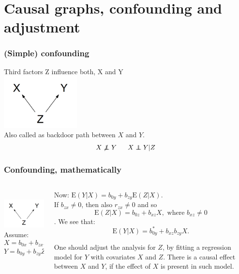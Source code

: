 \documentclass[10pt,dvipsnames,t ,handout%
,aspectratio=169%
]{beamer}%
\newcommand{\E}{\mathrm{E}}
\newcommand{\indep}{\perp\!\!\!\!\perp}
\begin{document}
\section{Causal graphs, confounding and adjustment}


\begin{frame}
	\frametitle{(Simple) confounding}
	Third factors  Z influence both, X and Y \\
	\includegraphics[width=4cm]{conf1}\\
	Also called as \alert{backdoor path} between $X$ and $Y$. \\
	
$$X \not\indep Y \; \hspace{0.5cm}  X \indep Y|Z$$
	
\end{frame}

\begin{frame}
	\frametitle{Confounding, mathematically}
\begin{columns}
\begin{column}{5cm}
\mbox{ } \\
	\includegraphics[width=4cm]{conf1}
	\mbox{}\\[0.5cm]
Assume:
$$X= b_{0x} + b_{zx}Z + \varepsilon_x, \ \E(\varepsilon_x|Z)=0 $$  
$$ Y= b_{0y} + b_{zy}Z + \varepsilon_y, \ \E(\varepsilon_y|Z, X)=0. $$
\end{column}
\begin{column}{7cm}
Now: 
$\E(Y|X) = b_{0y} + b_{zy}\E(Z|X). $ \\[0.2cm]
If  $b_{zx} \ne 0$, then also  $r_{zx} \ne 0$ and so 
$$ \E(Z|X) =  b_{0z}+ b_{xz}X, \mbox{ where }b_{xz} \ne 0$$. 
We see that:
$$\E(Y|X) = b_{0y}^* + b_{xz}b_{zy}X. $$

\begin{block}{}\alert{One should adjust the analysis for $Z$, by fitting a regression model for $Y$ with covariates
	$X$  and $Z$.} 
There is a causal effect between $X$ and $Y$, if the effect of $X$ is present in such model. \end{block}
\end{column}
\end{columns}
\end{frame}
\end{document}
